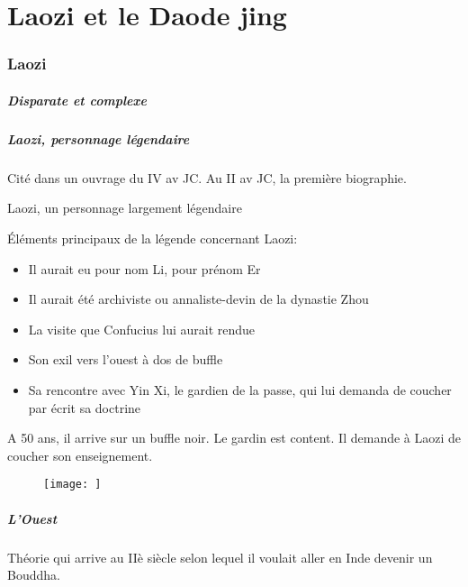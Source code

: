 \chapter{Laozi et le Daode jing}

\subsection{Laozi}
\paragraph{Disparate et complexe}

\paragraph{Laozi, personnage légendaire} Cité dans un ouvrage du IV av JC. Au II av JC, la première biographie. 



Laozi, un personnage largement légendaire


Éléments principaux de la légende concernant Laozi:
\begin{itemize}
    \item  	Il aurait eu pour nom Li, pour prénom Er
    \item 	Il aurait été archiviste ou annaliste-devin de la dynastie Zhou
    \item 	La visite que Confucius lui aurait rendue
    \item 	Son exil vers l’ouest à dos de buffle
    \item 	Sa rencontre avec Yin Xi, le gardien de la passe, qui lui demanda de coucher par écrit sa doctrine
\end{itemize}


A 50 ans, il arrive sur un buffle noir. Le gardin est content. Il demande à Laozi de coucher son enseignement.

\begin{figure}[!h]
    \centering
    \texttt{[image: ]}

    \label{fig:enter-label}
\end{figure}



\paragraph{L'Ouest} Théorie qui arrive au IIè siècle selon lequel il voulait aller en Inde devenir un Bouddha.



